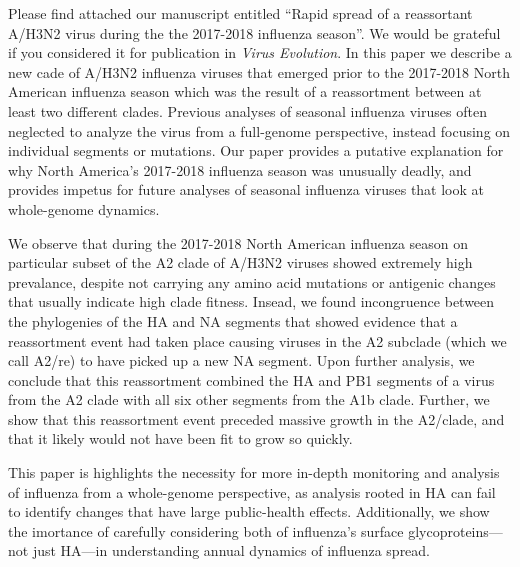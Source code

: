 \documentclass[stdletter,letterpaper,addrfromright,orderfromdateto,dateleft,11pt,noaddrto,sigleft]{newlfm}
\begin{document}
\begin{newlfm}
Please find attached our manuscript entitled ``Rapid spread of a reassortant A/H3N2 virus during the the 2017-2018 influenza season''.
We would be grateful if you considered it for publication in \textit{Virus Evolution}.
In this paper we describe a new cade of A/H3N2 influenza viruses that emerged prior to the 2017-2018 North American influenza season which was the result of a reassortment between at least two different clades.
Previous analyses of seasonal influenza viruses often neglected to analyze the virus from a full-genome perspective, instead focusing on individual segments or mutations.
Our paper provides a putative explanation for why North America's 2017-2018 influenza season was unusually deadly, and provides impetus for future analyses of seasonal influenza viruses that look at whole-genome dynamics.

We observe that during the 2017-2018 North American influenza season on particular subset of the A2 clade of A/H3N2 viruses showed extremely high prevalance, despite not carrying any amino acid mutations or antigenic changes that usually indicate high clade fitness.
Insead, we found incongruence between the phylogenies of the HA and NA segments that showed evidence that a reassortment event had taken place causing viruses in the A2 subclade (which we call A2/re) to have picked up a new NA segment.
Upon further analysis, we conclude that this reassortment combined the HA and PB1 segments of a virus from the A2 clade with all six other segments from the A1b clade.
Further, we show that this reassortment event preceded massive growth in the A2/clade, and that it likely would not have been fit to grow so quickly.

This paper is highlights the necessity for more in-depth monitoring and analysis of influenza from a whole-genome perspective, as analysis rooted in HA can fail to identify changes that have large public-health effects.
Additionally, we show the imortance of carefully considering both of influenza's surface glycoproteins---not just HA---in understanding annual dynamics of influenza spread.


\end{newlfm}
\end{document}
